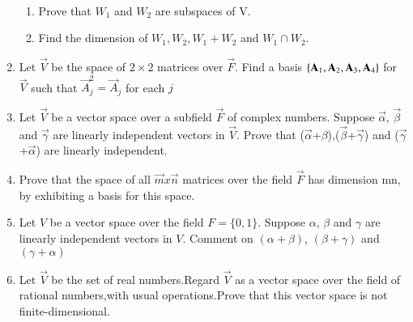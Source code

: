 \begin{enumerate}[label=\thesubsection.\arabic*.,ref=\thesubsection.\theenumi]
\begin{align}
\end{align}
%
\begin{enumerate}
    \item Prove that $W_1$ and $W_2$ are subspaces of V.
    \item Find the dimension of $W_1, W_2, W_1+W_2$ and $W_1\cap W_2$.
\end{enumerate}
%
\solution

%
\item Let $\vec{V}$ be the space of $2\times2$ matrices over $\vec{F}$. Find a basis $\left\{\mathbf{A}_1, \mathbf{A}_2, \mathbf{A}_3, \mathbf{A}_4\right\}$ for $\vec{V}$ such that $\vec{A}_j^2 = \vec{A}_j$ for each $j$
%
\\
\solution

%
\item    Let $\vec{V}$ be a vector space over a subfield $\vec{F}$ of complex numbers. Suppose $\vec{\alpha}$, $\vec{\beta}$ and $\vec{\gamma}$ are linearly independent vectors in $\vec{V}$. Prove that ($\vec{\alpha}$+$\beta$),($\vec{\beta}$+$\vec{\gamma}$) and ($\vec{\gamma}$+$\vec{\alpha}$) are linearly independent.
%
\\
\solution

%
\item Prove that the space of all $\vec{m} x \vec{n}$ matrices over the field $\vec{F}$ has dimension mn, by exhibiting a basis for this space. 
%
\\
\solution

%
\item Let $V$ be a vector space over the field $F = \{0,1\}$. Suppose $\alpha$, $\beta$ and $\gamma$ are linearly independent vectors in $V$. Comment on $(\alpha + \beta)$, $(\beta + \gamma)$ and $(\gamma + \alpha)$
%
\\
\solution

\item Let $\vec{V}$ be the set of real numbers.Regard  $\vec{V}$  as a vector space over the field of rational numbers,with usual operations.Prove that this vector space is not finite-dimensional.
\\
\solution

\end{enumerate}
